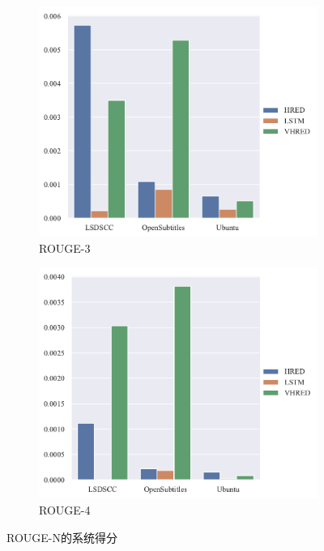 \begin{figure}[H]
    \begin{subfigure}{0.5\linewidth}
        \centering
        \includegraphics[width=\linewidth]{figure/barplot/rouge_3/plot.pdf}
        \caption{ROUGE-3}
    \end{subfigure}%
    \begin{subfigure}{0.5\linewidth}
        \centering
        \includegraphics[width=\linewidth]{figure/barplot/rouge_4/plot.pdf}
        \caption{ROUGE-4}
    \end{subfigure}
    \centering
    \caption{ROUGE-N的系统得分}
    \label{fig:ROUGE_N_system}
\end{figure}
